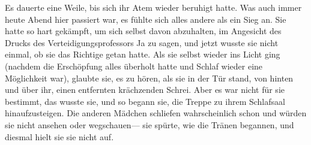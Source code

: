 Es dauerte eine Weile, bis sich ihr Atem wieder beruhigt hatte. Was auch immer heute Abend hier passiert war, es fühlte sich alles andere als ein Sieg an. Sie hatte so hart gekämpft, um sich selbst davon abzuhalten, im Angesicht des Drucks des Verteidigungsprofessors Ja zu sagen, und jetzt wusste sie nicht einmal, ob sie das Richtige getan hatte.
Als sie selbst wieder ins Licht ging (nachdem die Erschöpfung alles überholt hatte und Schlaf wieder eine Möglichkeit war), glaubte sie, es zu hören, als sie in der Tür stand, von hinten und über ihr, einen entfernten krächzenden Schrei.
Aber es war nicht für sie bestimmt, das wusste sie, und so begann sie, die Treppe zu ihrem Schlafsaal hinaufzusteigen.
Die anderen Mädchen schliefen wahrscheinlich schon und würden sie nicht ansehen oder wegschauen—
sie spürte, wie die Tränen begannen, und diesmal hielt sie sie nicht auf.

